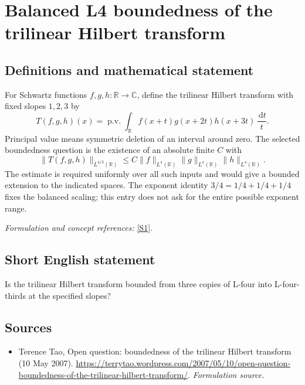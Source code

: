 \documentclass[11pt]{article}
\begin{document}
\section*{\texorpdfstring{Balanced L4 boundedness of the trilinear Hilbert transform}{Balanced L4 boundedness of the trilinear Hilbert transform}}\label{444}
\subsection{Definitions and mathematical statement}
For Schwartz functions $f,g,h:{\mathbb{R}}\to{\mathbb{C}}$, define the trilinear Hilbert transform with fixed slopes $1,2,3$ by
\[
 T(f,g,h)(x)=\operatorname{p.v.}\int_{{\mathbb{R}}}
 f(x+t)g(x+2t)h(x+3t)\,\frac{{\,\mathrm{d}} t}{t}.
\]
Principal value means symmetric deletion of an interval around zero. The selected boundedness question is the existence of an absolute finite $C$ with
\[
 \|T(f,g,h)\|_{L^{4/3}({\mathbb{R}})}
 \le C\|f\|_{L^4({\mathbb{R}})}\|g\|_{L^4({\mathbb{R}})}\|h\|_{L^4({\mathbb{R}})}.
\]
The estimate is required uniformly over all such inputs and would give a bounded extension to the indicated spaces. The exponent identity $3/4=1/4+1/4+1/4$ fixes the balanced scaling; this entry does not ask for the entire possible exponent range.
\par\smallskip\textit{Formulation and concept references:} \href{https://terrytao.wordpress.com/2007/05/10/open-question-boundedness-of-the-trilinear-hilbert-transform/}{[S1]}.

\subsection{Short English statement}
Is the trilinear Hilbert transform bounded from three copies of L-four into L-four-thirds at the specified slopes?
\subsection{Sources}
\begin{itemize}
\item[S1]Terence Tao, Open question: boundedness of the trilinear Hilbert transform (10 May 2007).
\url{https://terrytao.wordpress.com/2007/05/10/open-question-boundedness-of-the-trilinear-hilbert-transform/}.
\textit{Formulation source.}
\end{itemize}
\end{document}
